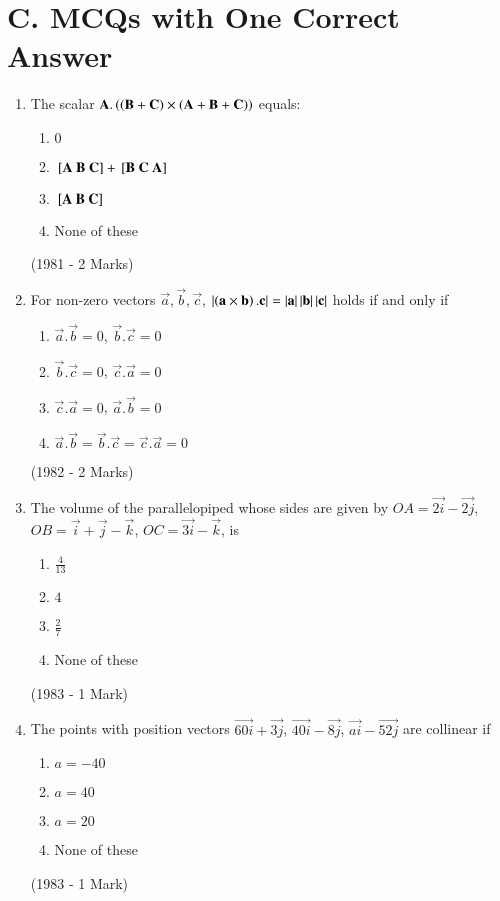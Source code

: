 \documentclass[journal]{IEEEtran}
\begin{document}
\section{C. MCQs with One Correct Answer}
\begin{enumerate}
\item The scalar $\mathbf{A}.\left(\left(\mathbf{B}+\mathbf{C})\times(\mathbf{A}+\mathbf{B}+\mathbf{C}\right)\right)$ equals:
\begin{enumerate}
\item  $0$
\item ${}\left[\mathbf{A}\ \mathbf{B}\ \mathbf{C}\right] + {}\left[\mathbf{B}\ \mathbf{C}\ \mathbf{A}\right]$
\item $\sbrak{\vec{A}\ \vec{B}\ \vec{C}}$
\item None of these
\end{enumerate}
\hfill (1981 - 2 Marks)

\item For non-zero vectors $\vec{a}, \vec{b}, \vec{c}$, $\left\vert\left(\mathbf{a}\times\mathbf{b}\right).\mathbf{c}\right\vert = \left\vert\mathbf{a}\right\vert\left\vert\mathbf{b}\right\vert\left\vert\mathbf{c}\right\vert$ holds if and only if
\begin{enumerate}
\item $\vec{a}.\vec{b}=0$, $\vec{b}.\vec{c}=0$
\item $\vec{b}.\vec{c}=0$, $\vec{c}.\vec{a}=0$
\item $\vec{c}.\vec{a}=0$, $\vec{a}.\vec{b}=0$
\item $\vec{a}.\vec{b}= \vec{b}.\vec{c}= \vec{c}.\vec{a}=0$
\end{enumerate}
\hfill (1982 - 2 Marks)

\item The volume of the parallelopiped whose sides are given by $OA =\vec{2i}-\vec{2j}$, $OB = \vec{i}+\vec{j}-\vec{k}$, $OC = \vec{3i}-\vec{k}$, is 
\begin{enumerate}
\item $\frac{4}{13}$
\item $4$
\item $\frac{2}{7}$
\item None of these
\end{enumerate}
\hfill (1983 - 1 Mark)

\item The points with position vectors $\vec{60i} + \vec{3j}$, $\vec{40i}-\vec{8j}$, $\vec{ai}-\vec{52j}$ are collinear if
\begin{enumerate}
\item $a=-40$
\item $a=40$
\item $a=20$
\item None of these
\end{enumerate}
\hfill (1983 - 1 Mark)


\end{enumerate}
\end{document}
